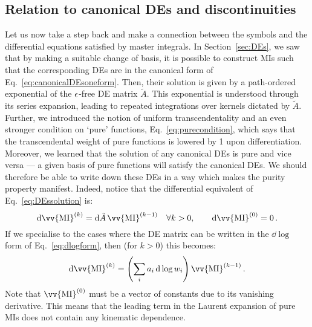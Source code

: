 \documentclass[main.tex]{subfiles}
\begin{document}
\subsection{Relation to canonical DEs and discontinuities}
Let us now take a step back and make a connection between the symbols and the differential equations satisfied by master integrals. In Section~\ref{sec:DEs}, we saw that by making a suitable change of basis, it is possible to construct MIs such that the corresponding DEs are in the canonical form of Eq.~\ref{eq:canonicalDEsoneform}. Then, their solution is given by a path-ordered exponential of the $\epsilon$-free DE matrix $\tilde{A}$. This exponential is understood through its series expansion, leading to repeated integrations over kernels dictated by $\tilde{A}$. Further, we introduced the notion of uniform transcendentality and an even stronger condition on `pure' functions, Eq.~\ref{eq:purecondition}, which says that the transcendental weight of pure functions is lowered by 1 upon differentiation. Moreover, we learned that the solution of any canonical DEs is pure and vice versa --- a given basis of pure functions will satisfy the canonical DEs. We should therefore be able to write down these DEs in a way which makes the purity property manifest. Indeed, notice that the differential equivalent of Eq.~\ref{eq:DEssolution} is:
\begin{equation}
    \dd \vv{\text{MI}}^{(k)} = \dd \tilde{A} \, \vv{\text{MI}}^{(k-1)} \quad \forall k>0, \qquad \dd \vv{\text{MI}}^{(0)} = 0\,.
\end{equation}
If we specialise to the cases where the DE matrix can be written in the $\dd \log$ form of Eq.~\ref{eq:dlogform}, then (for $k>0$) this becomes:
\begin{equation} \label{eq:pureMIDEs}
    \dd \vv{\text{MI}}^{(k)} = \left( \sum_i a_i \, \dd \log w_i  \right)\vv{\text{MI}}^{(k-1)}\,.
\end{equation}
Note that $\vv{\text{MI}}^{(0)}$ must be a vector of constants due to its vanishing derivative. This means that the leading term in the Laurent expansion of pure MIs does not contain any kinematic dependence. 
\end{document}
